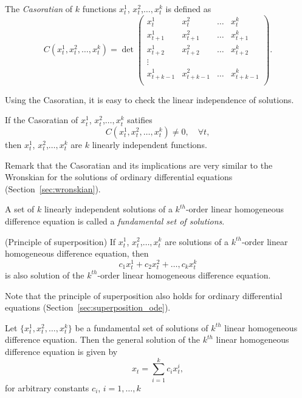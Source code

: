 \begin{definition}
The \emph{Casoratian} of $k$ functions $x_t^1$, $x_t^2$,$\dots, x_t^k$ is defined as 
$$C(x_t^1, x_t^2,\dots, x_t^k)=\det \left (
\begin{array}{cccc}
x_t^1 & x_t^2 & \dots & x_t^k\\
x_{t+1}^1 & x_{t+1}^2 & \dots & x_{t+1}^k\\
x_{t+2}^1 & x_{t+2}^2 & \dots & x_{t+2}^k\\
\vdots & & &\\
x_{t+k-1}^1 & x_{t+k-1}^2 & \dots & x_{t+k-1}^k\\
\end{array}\right ).$$
\end{definition}
Using the Casoratian, it is easy to check the linear independence of solutions.
\begin{proposition}
If the Casoratian of $x_t^1$, $x_t^2$,$\dots, x_t^k$ satifies
$$C(x_t^1, x_t^2,\dots, x_t^k)\not =0, \quad \forall t,$$
then $x_t^1$, $x_t^2$,$\dots, x_t^k$  are $k$ linearly independent functions.
\end{proposition}
Remark that the Casoratian and its implications are very similar to the Wronskian for the solutions of ordinary differential equations (Section~\ref{sec:wronskian}).
\begin{definition}
A set of $k$ linearly independent solutions of a $k^{th}$-order linear homogeneous difference equation is called a 
\emph{fundamental set of solutions}.
\end{definition}

\begin{proposition}(Principle of superposition)
If $x_t^1$, $x_t^2$,$\dots, x_t^k$ are solutions of a $k^{th}$-order linear homogeneous difference equation, then $$c_1x_t^1+c_2x_t^2+\dots, c_kx_t^k$$
is also solution of the $k^{th}$-order linear homogeneous difference equation.
\end{proposition}
Note that the principle of superposition also holds for ordinary differential equations (Section~\ref{sec:superposition_ode}).
\begin{definition}
Let $\{x_t^1, x_t^2,\dots, x_t^k\}$ be a fundamental set of solutions of $k^{th}$ linear homogeneous difference equation. Then the general solution of the  $k^{th}$ linear homogeneous difference equation is given by $$x_t=\sum_{i=1}^kc_ix^i_t,$$ for arbitrary constants $c_i$, $i=1,\dots, k$
\end{definition}

